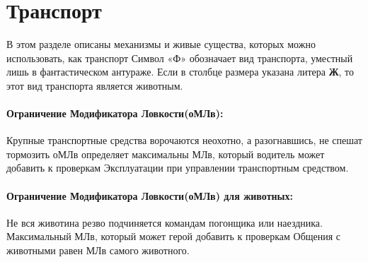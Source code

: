 \section{Транспорт}
В этом разделе описаны механизмы и живые существа, которых можно использовать, как транспорт
\newline Символ «Ф» обозначает вид транспорта, уместный лишь в фантастическом антураже.
\newline Если в столбце размера указана литера \textbf{Ж}, то этот вид транспорта является животным.
\paragraph{Ограничение Модификатора Ловкости(оМЛв):} Крупные транспортные средства ворочаются неохотно, а разогнавшись, не спешат тормозить оМЛв определяет максимальны МЛв, который водитель может добавить к проверкам Эксплуатации при управлении транспортным средством.
\paragraph{Ограничение Модификатора Ловкости(оМЛв) для животных:} Не вся животина резво подчиняется командам погонщика или наездника. Максимальный МЛв, который может герой добавить к проверкам Общения с животными равен МЛв самого животного.
